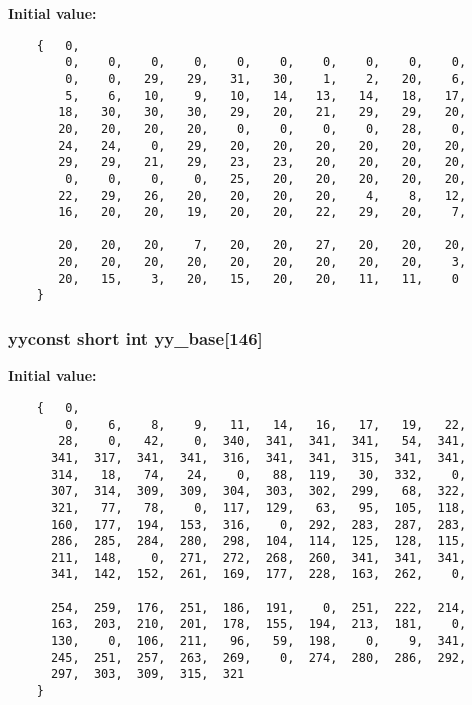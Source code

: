 {\bf Initial value:}

\footnotesize\begin{verbatim}
    {   0,
        0,    0,    0,    0,    0,    0,    0,    0,    0,    0,
        0,    0,   29,   29,   31,   30,    1,    2,   20,    6,
        5,    6,   10,    9,   10,   14,   13,   14,   18,   17,
       18,   30,   30,   30,   29,   20,   21,   29,   29,   20,
       20,   20,   20,   20,    0,    0,    0,    0,   28,    0,
       24,   24,    0,   29,   20,   20,   20,   20,   20,   20,
       29,   29,   21,   29,   23,   23,   20,   20,   20,   20,
        0,    0,    0,    0,   25,   20,   20,   20,   20,   20,
       22,   29,   26,   20,   20,   20,   20,    4,    8,   12,
       16,   20,   20,   19,   20,   20,   22,   29,   20,    7,

       20,   20,   20,    7,   20,   20,   27,   20,   20,   20,
       20,   20,   20,   20,   20,   20,   20,   20,   20,    3,
       20,   15,    3,   20,   15,   20,   20,   11,   11,    0
    }\end{verbatim}\normalsize 
{}
\subsubsection{\setlength{\rightskip}{0pt plus 5cm}yyconst short int yy\_\-base[146]\hspace{0.3cm}{\tt  [static]}}\label{vcd__lexer_8c_a91}


{\bf Initial value:}

\footnotesize\begin{verbatim}
    {   0,
        0,    6,    8,    9,   11,   14,   16,   17,   19,   22,
       28,    0,   42,    0,  340,  341,  341,  341,   54,  341,
      341,  317,  341,  341,  316,  341,  341,  315,  341,  341,
      314,   18,   74,   24,    0,   88,  119,   30,  332,    0,
      307,  314,  309,  309,  304,  303,  302,  299,   68,  322,
      321,   77,   78,    0,  117,  129,   63,   95,  105,  118,
      160,  177,  194,  153,  316,    0,  292,  283,  287,  283,
      286,  285,  284,  280,  298,  104,  114,  125,  128,  115,
      211,  148,    0,  271,  272,  268,  260,  341,  341,  341,
      341,  142,  152,  261,  169,  177,  228,  163,  262,    0,

      254,  259,  176,  251,  186,  191,    0,  251,  222,  214,
      163,  203,  210,  201,  178,  155,  194,  213,  181,    0,
      130,    0,  106,  211,   96,   59,  198,    0,    9,  341,
      245,  251,  257,  263,  269,    0,  274,  280,  286,  292,
      297,  303,  309,  315,  321
    }\end{verbatim}\normalsize 
{}
